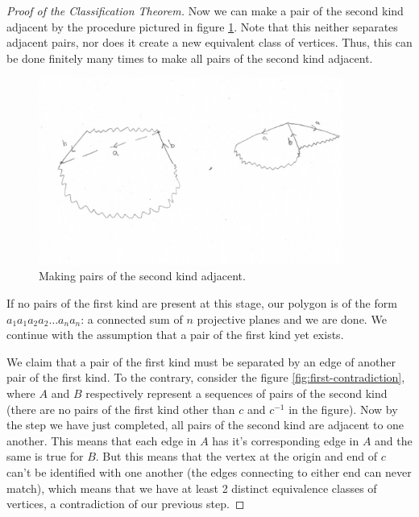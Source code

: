 \begin{proof}[Proof of the Classification Theorem]
   Now we can make a pair of the second kind adjacent by the procedure
   pictured in figure \ref{fig:second-adjacent}. Note that this neither
   separates adjacent pairs, nor does it create a new equivalent class
   of vertices. Thus, this can be done finitely many times to make all
   pairs of the second kind adjacent.

   \begin{figure}[htbp]
     \centering
     \includegraphics[width=10cm]{second.png}
     \caption{Making pairs of the second kind adjacent.}
     \label{fig:second-adjacent}
   \end{figure}

   If no pairs of the first kind are present at this stage, our
   polygon is of the form $a_1a_1a_2a_2 \dots a_na_n$: a connected sum
   of $n$ projective planes and we are done. We continue with the
   assumption that a pair of the first kind yet exists.

   We claim that a pair of the first kind must be separated by an edge
   of another pair of the first kind. To the
   contrary, consider the figure \ref{fig:first-contradiction}, where
   $A$ and $B$ respectively represent a sequences of pairs of the
   second kind (there are no pairs of the first kind other than $c$
   and $c^{-1}$ in the figure). Now by the step we have just
   completed, all pairs of the second kind are adjacent to one
   another. This means that each edge in $A$ has it's corresponding
   edge in $A$ and the same is true for $B$. But this means that
   the vertex at the origin and end of $c$ can't be identified with
   one another (the edges connecting to either end can never match),
   which means that we have at least 2 distinct equivalence classes of
   vertices, a contradiction of our previous step.


\end{proof}
